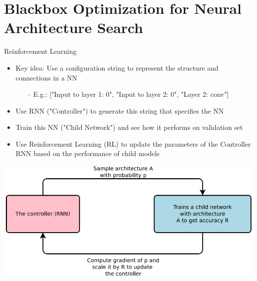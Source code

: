\section{Blackbox Optimization for Neural Architecture Search}
\begin{frame}[c]{Reinforcement Learning }
\centering
\begin{itemize}
	\item Key idea: Use a configuration string to represent the structure and connections in a NN
	\begin{itemize}
		\item[--] E.g.: ["Input to layer 1: 0", "Input to layer 2: 0", "Layer 2: conv"]
	\end{itemize}
	\item Use RNN ("\alert{Controller}") to generate this string that specifies the NN
	\item Train this NN ("\alert{Child Network}") and see how it performs on validation set
	\item Use \alert{Reinforcement Learning (RL)} to update the parameters of the Controller RNN based on the performance of
	child models
\end{itemize}

{\centering
	\includegraphics[width=.6\textwidth]{images_lec7/s27}
}
\end{frame}
